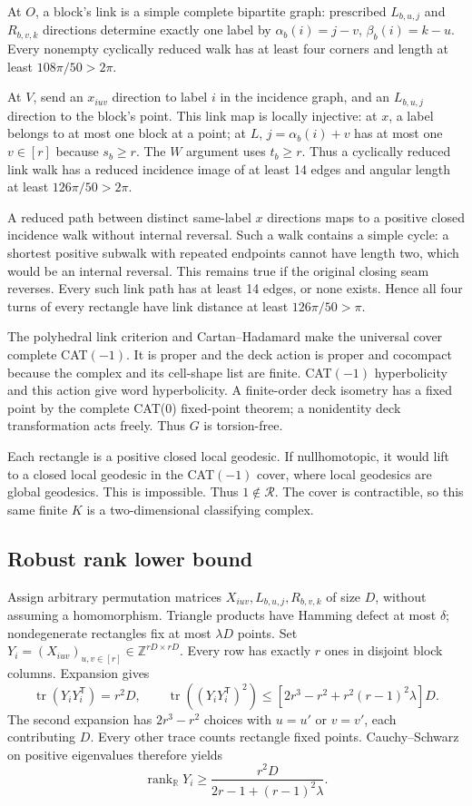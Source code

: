 \documentclass[11pt]{article}
\theoremstyle{definition}
\DeclareMathOperator{\rank}{rank}
\DeclareMathOperator{\tr}{tr}
\newcommand{\R}{\mathbb R}
\begin{document}
At $O$, a block's link is a simple complete bipartite graph:
prescribed $L_{b,u,j}$ and $R_{b,v,k}$ directions determine exactly one
label by $\alpha_b(i)=j-v$, $\beta_b(i)=k-u$.
Every nonempty cyclically reduced walk has at least four corners and
length at least $108\pi/50>2\pi$.

At $V$, send an $x_{iuv}$ direction to label $i$ in the incidence graph,
and an $L_{b,u,j}$ direction to the block's point. This link map is
locally injective: at $x$, a label belongs to at most one block at a
point; at $L$, $j=\alpha_b(i)+v$ has at most one $v\in[r]$ because
$s_b\ge r$. The $W$ argument uses $t_b\ge r$.
Thus a cyclically reduced link walk has a reduced incidence image
of at least 14 edges and angular length at least $126\pi/50>2\pi$.

A reduced path between distinct same-label $x$ directions maps to
a positive closed incidence walk without internal reversal. Such a
walk contains a simple cycle: a shortest positive subwalk with repeated
endpoints cannot have length two, which would be an internal reversal.
This remains true if the original closing seam reverses.
Every such link path has at least 14 edges, or none exists. Hence
all four turns of every rectangle have link distance at least
$126\pi/50>\pi$.

The polyhedral link criterion and Cartan--Hadamard
\cite{BH,bridson} make the universal cover complete CAT$(-1)$.
It is proper and the deck action is proper and cocompact because the
complex and its cell-shape list are finite. CAT$(-1)$ hyperbolicity
and this action give word hyperbolicity.
A finite-order deck isometry has a fixed point by the complete CAT(0)
fixed-point theorem; a nonidentity deck transformation acts freely.
Thus $G$ is torsion-free.

Each rectangle is a positive closed local geodesic. If nullhomotopic,
it would lift to a closed local geodesic in the CAT$(-1)$ cover,
where local geodesics are global geodesics. This is impossible.
Thus $1\notin\mathcal R$. The cover is contractible, so this same
finite $K$ is a two-dimensional classifying complex.

\subsection{Robust rank lower bound}
Assign arbitrary permutation matrices $X_{iuv},L_{b,u,j},R_{b,v,k}$
of size $D$, without assuming a homomorphism. Triangle products have
Hamming defect at most $\delta$; nondegenerate rectangles fix at most
$\lambda D$ points. Set
$Y_i=(X_{iuv})_{u,v\in[r]}\in\mathbb Z^{rD\times rD}$.
Every row has exactly $r$ ones in disjoint block columns. Expansion
gives
\[
 \tr(Y_iY_i^{\mathsf T})=r^2D,\qquad
 \tr((Y_iY_i^{\mathsf T})^2)
 \le[2r^3-r^2+r^2(r-1)^2\lambda]D.
\]
The second expansion has $2r^3-r^2$ choices with $u=u'$ or $v=v'$,
each contributing $D$. Every other trace counts rectangle fixed
points. Cauchy--Schwarz on positive eigenvalues therefore yields
\begin{equation}\label{eq:realrank}
 \rank_\R Y_i\ge\frac{r^2D}{2r-1+(r-1)^2\lambda}.
\end{equation}
\end{document}
